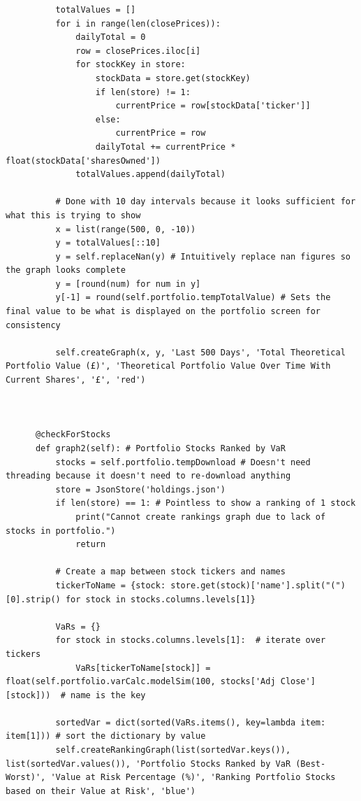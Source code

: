 \documentclass{article}
\begin{document}
\begin{verbatim}
          totalValues = []
          for i in range(len(closePrices)):
              dailyTotal = 0
              row = closePrices.iloc[i]
              for stockKey in store:
                  stockData = store.get(stockKey)
                  if len(store) != 1:
                      currentPrice = row[stockData['ticker']]
                  else:
                      currentPrice = row
                  dailyTotal += currentPrice * float(stockData['sharesOwned'])
              totalValues.append(dailyTotal)

          # Done with 10 day intervals because it looks sufficient for what this is trying to show
          x = list(range(500, 0, -10))
          y = totalValues[::10]
          y = self.replaceNan(y) # Intuitively replace nan figures so the graph looks complete
          y = [round(num) for num in y]
          y[-1] = round(self.portfolio.tempTotalValue) # Sets the final value to be what is displayed on the portfolio screen for consistency

          self.createGraph(x, y, 'Last 500 Days', 'Total Theoretical Portfolio Value (£)', 'Theoretical Portfolio Value Over Time With Current Shares', '£', 'red')



      @checkForStocks
      def graph2(self): # Portfolio Stocks Ranked by VaR
          stocks = self.portfolio.tempDownload # Doesn't need threading because it doesn't need to re-download anything
          store = JsonStore('holdings.json')
          if len(store) == 1: # Pointless to show a ranking of 1 stock
              print("Cannot create rankings graph due to lack of stocks in portfolio.")
              return

          # Create a map between stock tickers and names
          tickerToName = {stock: store.get(stock)['name'].split("(")[0].strip() for stock in stocks.columns.levels[1]}

          VaRs = {}
          for stock in stocks.columns.levels[1]:  # iterate over tickers
              VaRs[tickerToName[stock]] = float(self.portfolio.varCalc.modelSim(100, stocks['Adj Close'][stock]))  # name is the key

          sortedVar = dict(sorted(VaRs.items(), key=lambda item: item[1])) # sort the dictionary by value
          self.createRankingGraph(list(sortedVar.keys()), list(sortedVar.values()), 'Portfolio Stocks Ranked by VaR (Best-Worst)', 'Value at Risk Percentage (%)', 'Ranking Portfolio Stocks based on their Value at Risk', 'blue')




\end{verbatim}
\end{document}

